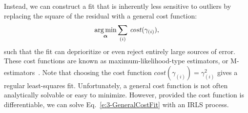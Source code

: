 Instead, we can construct a fit that is inherently less sensitive to outliers by replacing the square of the residual with a general cost function:
\begin{equation}
  \operatorname*{arg\,min}_{\bm{\alpha}} \sum\limits_{(i)}\,\mathit{cost}(\gamma_{(i)}),\label{e:3-GeneralCostFit}
\end{equation}
such that the fit can deprioritize or even reject entirely large sources of error.
These cost functions are known as maximum-likelihood-type estimators, or M-estimators~\cite{RN269}.
Note that choosing the cost function $\mathit{cost}(\gamma_{(i)}) = \gamma_{(i)}^2$ gives a regular least-squares fit.
Unfortunately, a general cost function is not often analytically solvable or easy to minimize.
However, provided the cost function is differentiable, we can solve Eq.~\ref{e:3-GeneralCostFit} with an IRLS process.

